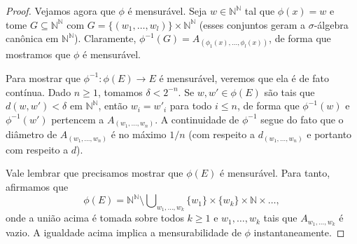 \documentclass[reqno, final]{book}
\newcommand*\1{\mathds{1}}
\DeclareMathOperator*{\mcup}{{\textstyle \bigcup}}
\begin{document}
\begin{proof}
  Vejamos agora que $\phi$ é mensurável.
  Seja $w \in \mathbb{N}^\mathbb{N}$ tal que $\phi(x) = w$ e tome $G \subseteq \mathbb{N}^\mathbb{N}$ com $G = \{(w_1, \dots, w_l)\} \times \mathbb{N}^\mathbb{N}$ (esses conjuntos geram a $\sigma$-álgebra canônica em $\mathbb{N}^\mathbb{N}$).
  Claramente, $\phi^{-1}(G) = A_{(\phi_1(x), \dots, \phi_l(x))}$, de forma que mostramos que $\phi$ é mensurável.

  Para mostrar que $\phi^{-1}:\phi(E) \to E$ é mensurável, veremos que ela é de fato contínua.
  Dado $n \geq 1$, tomamos $\delta < 2^{-n}$.
  Se $w, w' \in \phi(E)$ são tais que $d(w, w') < \delta$ em $\mathbb{N}^\mathbb{N}$, então $w_i = w'_i$ para todo $i \leq n$, de forma que $\phi^{-1}(w)$ e $\phi^{-1}(w')$ pertencem a $A_{(w_1, \dots, w_n)}$.
  A continuidade de $\phi^{-1}$ segue do fato que o diâmetro de $A_{(w_1, \dots, w_n)}$ é no máximo $1/n$ (com respeito a $d_{(w_1, \dots, w_n)}$ e portanto com respeito a $d$).

  Vale lembrar que precisamos mostrar que $\phi(E)$ é mensurável.
  Para tanto, afirmamos que
  \begin{equation}
    \label{e:phiE_mensur}
    \phi(E) = \mathbb{N}^\mathbb{N} \setminus \mcup_{w_1, \dots, w_k} \{w_1\} \times \{w_k\} \times \mathbb{N} \times \dots,
  \end{equation}
  onde a união acima é tomada sobre todos $k \geq 1$ e $w_1, \dots, w_k$ tais que $A_{w_1, \dots, w_k}$ é vazio.
  A igualdade acima implica a mensurabilidade de $\phi$ instantaneamente.


\end{proof}
\end{document}
